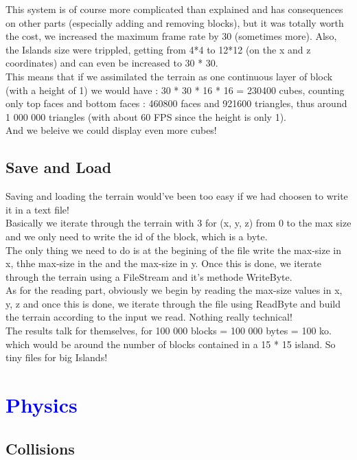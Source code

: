 \documentclass[article]{report}         %
\begin{document}
          This system is of course more complicated than explained and has consequences on other parts (especially adding and removing blocks), but it was totally worth the cost, we increased the maximum  frame rate by 30 (sometimes more). Also, the Islands size were trippled, getting from 4*4 to 12*12 (on the x and z coordinates) and can even be increased to 30 * 30.\\
          This means that if we assimilated the terrain as one continuous layer of block (with a height of 1) we would have : 30 * 30 * 16 * 16 = 230400 cubes, counting only top faces and bottom faces : 460800 faces and 921600 triangles, thus around 1 000 000 triangles (with about 60 FPS since the height is only 1).\\
          And we beleive we could display even more cubes!\\

      \section{Save and Load}
        Saving and loading the terrain would've been too easy if we had choosen to write it in a text file!\\
        Basically we iterate through the terrain with 3 for (x, y, z) from 0 to the max size and we only need to write the id of the block, which is a byte.\\
        The only thing we need to do is at the begining of the file write the max-size in x, thhe max-size in the and the max-size in y. Once this is done, we iterate through the terrain using a FileStream and it's methode WriteByte.\\

        As for the reading part, obviously we begin by reading the max-size values in x, y, z and once this is done, we iterate through the file using ReadByte and build the terrain according to the input we read. Nothing really technical!\\
      
       The results talk for themselves, for 100 000 blocks = 100 000 bytes = 100 ko. which would be around the number of blocks contained in a 15 * 15 island. So tiny files for big Islands!\\

    \chapter{\textcolor{blue}{Physics}}
      \section{Collisions} %
\end{document}
